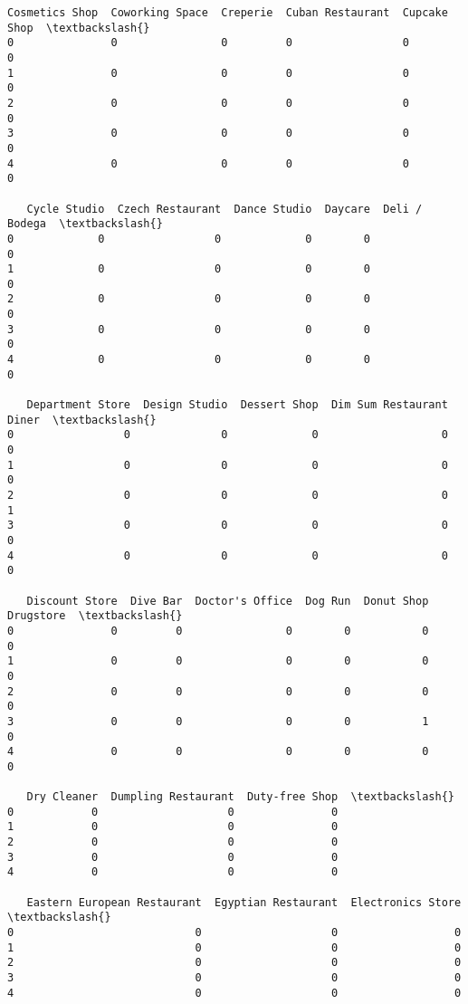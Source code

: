 \documentclass[11pt]{article}
\begin{document}
\begin{tcolorbox}[breakable, size=fbox, boxrule=.5pt, pad at break*=1mm, opacityfill=0]
\begin{Verbatim}[commandchars=\\\{\}]
   Cosmetics Shop  Coworking Space  Creperie  Cuban Restaurant  Cupcake Shop  \textbackslash{}
0               0                0         0                 0             0
1               0                0         0                 0             0
2               0                0         0                 0             0
3               0                0         0                 0             0
4               0                0         0                 0             0

   Cycle Studio  Czech Restaurant  Dance Studio  Daycare  Deli / Bodega  \textbackslash{}
0             0                 0             0        0              0
1             0                 0             0        0              0
2             0                 0             0        0              0
3             0                 0             0        0              0
4             0                 0             0        0              0

   Department Store  Design Studio  Dessert Shop  Dim Sum Restaurant  Diner  \textbackslash{}
0                 0              0             0                   0      0
1                 0              0             0                   0      0
2                 0              0             0                   0      1
3                 0              0             0                   0      0
4                 0              0             0                   0      0

   Discount Store  Dive Bar  Doctor's Office  Dog Run  Donut Shop  Drugstore  \textbackslash{}
0               0         0                0        0           0          0
1               0         0                0        0           0          0
2               0         0                0        0           0          0
3               0         0                0        0           1          0
4               0         0                0        0           0          0

   Dry Cleaner  Dumpling Restaurant  Duty-free Shop  \textbackslash{}
0            0                    0               0
1            0                    0               0
2            0                    0               0
3            0                    0               0
4            0                    0               0

   Eastern European Restaurant  Egyptian Restaurant  Electronics Store  \textbackslash{}
0                            0                    0                  0
1                            0                    0                  0
2                            0                    0                  0
3                            0                    0                  0
4                            0                    0                  0


\end{Verbatim}
\end{tcolorbox}
\end{document}
